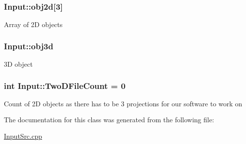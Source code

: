 \subsubsection[{\texorpdfstring{obj2d}{obj2d}}]{ Input\+::obj2d\mbox{[}3\mbox{]}}\hypertarget{classInput_a9564e8dcf0ba881f46a89e51840836d9}{}\label{classInput_a9564e8dcf0ba881f46a89e51840836d9}
Array of 2D objects 
\subsubsection[{\texorpdfstring{obj3d}{obj3d}}]{ Input\+::obj3d}\hypertarget{classInput_ab12646f36b9b1eeeb3aa09adf8cec077}{}\label{classInput_ab12646f36b9b1eeeb3aa09adf8cec077}
3D object 
\subsubsection[{\texorpdfstring{Two\+D\+File\+Count}{TwoDFileCount}}]{\setlength{\rightskip}{0pt plus 5cm}int Input\+::\+Two\+D\+File\+Count = 0}\hypertarget{classInput_a82141fe9142aec447f9ef52fd2f78c73}{}\label{classInput_a82141fe9142aec447f9ef52fd2f78c73}
Count of 2D objects as there has to be 3 projections for our software to work on 

The documentation for this class was generated from the following file\+:\begin{DoxyCompactItemize}
\item 
\hyperlink{InputSrc_8cpp}{Input\+Src.\+cpp}\end{DoxyCompactItemize}
